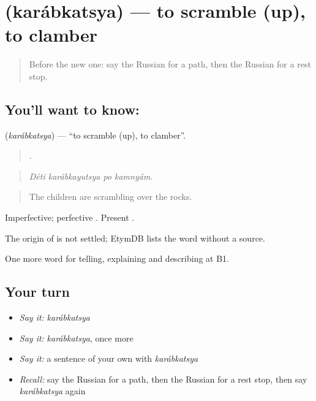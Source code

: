 \section[\texorpdfstring{\ru{карабкаться} (karábkatsya)}{карабкаться (karábkatsya)}]{ (karábkatsya) — to scramble (up), to clamber}

\label{lesson:RU-C459-karabkatsya}



\begin{quote}
Before the new one: say the Russian for a path, then the Russian for a rest stop.
\end{quote}

\subsection*{You'll want to know: }
\textbf{} (\emph{karábkatsya}) — \textquotedblleft{}to scramble (up), to clamber\textquotedblright{}.

\begin{quote}
   .
\end{quote}

\begin{quote}
\emph{Déti karábkayutsya po kamnyám.}
\end{quote}

\begin{quote}
The children are scrambling over the rocks.
\end{quote}

Imperfective; perfective \emph{}. Present \emph{}.

\begin{cousinweb}
The origin of \emph{} is not settled; EtymDB lists the word without a source.
\end{cousinweb}

\begin{grammarlens}[title={What you've built}]
One more word for telling, explaining and describing at B1.
\end{grammarlens}

\subsection*{Your turn}
\begin{itemize}
\raggedright
  \item \emph{Say it:} \emph{karábkatsya}
  \item \emph{Say it:} \emph{karábkatsya}, once more
  \item \emph{Say it:} a sentence of your own with \emph{karábkatsya}
  \item \emph{Recall:} say the Russian for a path, then the Russian for a rest stop, then say \emph{karábkatsya} again
\end{itemize}

